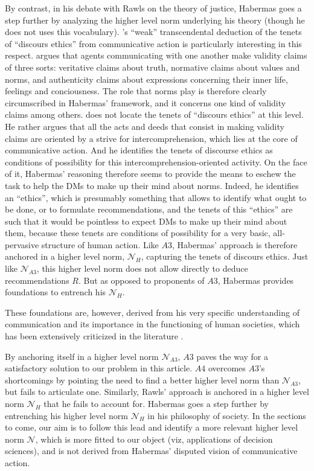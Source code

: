\documentclass[preprint, french, english, 11pt, authoryear]{elsarticle}%
\newcommand{\adv}{\mathscr{N}}
\begin{document}
By contrast, in his debate with Rawls on the theory of justice, Habermas goes a step further by analyzing the higher level norm underlying his theory (though he does not uses this vocabulary). \cite{habermas_moralbewustsein_1983}'s ``weak'' transcendental deduction of the tenets of ``discours ethics'' from communicative action is particularly interesting in this respect. \citet{habermas_theorie_1981} argues that agents communicating with one another make validity claims of three sorts: veritative claims about truth, normative claims about values and norms, and authenticity claims about expressions concerning their inner life, feelings and conciousness. The role that norms play is therefore clearly circumscribed in Habermas' framework, and it concerns one kind of validity claims among others. \cite{habermas_moralbewustsein_1983} does not locate the tenets of ``discours ethics'' at this level. He rather argues that all the acts and deeds that consist in making validity claims are oriented by a strive for intercomprehension, which lies at the core of communicative action. And he identifies the tenets of discourse ethics as conditions of possibility for this intercomprehension-oriented activity. On the face of it, Habermas' reasoning therefore seems to provide the means to eschew the task to help the \acp{DM} to make up their mind about norms. Indeed, he identifies an ``ethics'', which is presumably something that allows to identify what ought to be done, or to formulate recommendations, and the tenets of this ``ethics'' are such that it would be pointless to expect \acp{DM} to make up their mind about them, because these tenets are conditions of possibility for a very basic, all-pervasive structure of human action. Like $A3$, Habermas' approach is therefore anchored in a higher level norm, $\mathscr{N}_{H}$, capturing the tenets of discours ethics. Just like $\mathscr{N}_{A3}$, this higher level norm does not allow directly to deduce recommendations $R$. But as opposed to proponents of $A3$, Habermas provides foundations to entrench his $\mathscr{N}_{H}$. 

These foundations are, however, derived from his very specific understanding of communication and its importance in the functioning of human societies, which has been extensively criticized in the literature \citep{heath_communicative_2001,honneth_kritik_1985}. 

By anchoring itself in a higher level norm $\mathscr{N}_{A3}$, $A3$ paves the way for a satisfactory solution to our problem in this article. $A4$ overcomes $A3$'s shortcomings by pointing the need to find a better higher level norm than $\mathscr{N}_{A3}$, but fails to articulate one. Similarly, Rawls' approach is anchored in a higher level norm $\mathscr{N}_{H}$ that he fails to account for. Habermas goes a step further by entrenching his higher level norm $\mathscr{N}_{H}$ in his philosophy of society. In the sections to come, our aim is to follow this lead and identify a more relevant higher level norm $\adv$, which is more fitted to our object (viz, applications of decision sciences), and is not derived from Habermas' disputed vision of communicative action.
\end{document}
